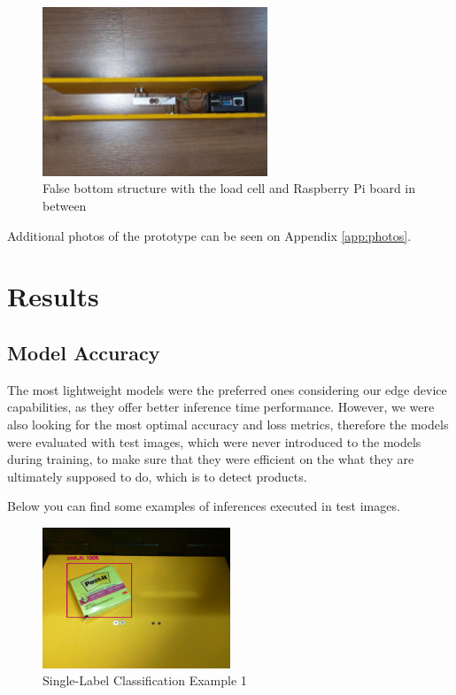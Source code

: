 \documentclass[openright]{normas-utf-tex} %
\begin{document}
\begin{figure}[H]
	\centering
	\includegraphics[width=0.6\textwidth]{./images/cartbase2.jpeg}
	\caption[False bottom structure with the load cell and Raspberry Pi board in between]{False bottom structure with the load cell and Raspberry Pi board in between}
\end{figure}

Additional photos of the prototype can be seen on Appendix \ref{app:photos}.

\chapter{Results}

\section{Model Accuracy}

The most lightweight models were the preferred ones considering our edge device capabilities,
as they offer better inference time performance. 
However, we were also looking for the most optimal accuracy and loss metrics, 
therefore the models were evaluated with test images, which were never introduced to the models
during training, to make sure that they were efficient on the what they are ultimately supposed to do, 
which is to detect products.

Below you can find some examples of inferences executed in test images. 

\begin{figure}[H]
	\centering
	\includegraphics[width=0.5\textwidth]{./images/singlelabel-classification-1.png}
	\caption[Single-Label Classification Example 1]{Single-Label Classification Example 1}
\end{figure}
\end{document}
